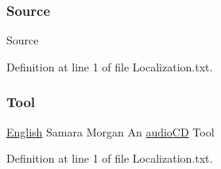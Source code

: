 \subsubsection{\texorpdfstring{Source}{Source}}
{\footnotesize\ttfamily Source}



Definition at line 1 of file Localization.\+txt.

\mbox{\label{_the_01_restless_01_curse_2_config_2_localization_8txt_a5bc3eed766fdcc36e0065707852593ac}} 
\subsubsection{\texorpdfstring{Tool}{Tool}}
{\footnotesize\ttfamily \mbox{\hyperlink{_sphere_i_i_01_winter_01_project_2_config_2_localization_8txt_ad896b63205779b1b09e86d941ce13976}{English}} Samara Morgan An \mbox{\hyperlink{_sphere_i_i_01_music_01_boxes_2_config_2_localization_8txt_ae0a4281bb52a78c638f75d315de5da12}{audio\+CD}} Tool}



Definition at line 1 of file Localization.\+txt.

